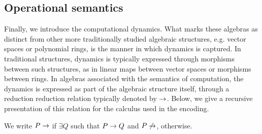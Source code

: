 \subsection{Operational semantics}

Finally, we introduce the computational dynamics. What marks these
algebras as distinct from other more traditionally studied algebraic
structures, e.g. vector spaces or polynomial rings, is the manner in
which dynamics is captured. In traditional structures, dynamics is typically
expressed through morphisms between such structures, as in linear maps
between vector spaces or morphisms between rings. In algebras
associated with the semantics of computation, the dynamics is
expressed as part of the algebraic structure itself, through a
reduction reduction relation typically denoted by $\rightarrow$. Below, we
give a recursive presentation of this relation for the calculus used
in the encoding.


We write $P\rightarrow$ if $\exists Q $ such that $ P \rightarrow Q$ and $P\not\rightarrow$, otherwise.




